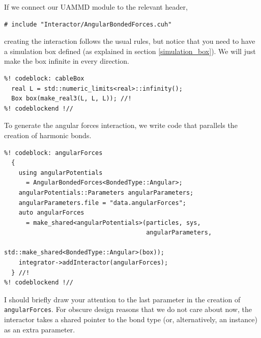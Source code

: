 If we connect our UAMMD module to the relevant header,
\begin{lstlisting}
# include "Interactor/AngularBondedForces.cuh"
\end{lstlisting}
creating the interaction follows the usual rules, but notice that you need to
have a simulation box defined (as explained in section \ref{simulation_box}). We
will just make the box infinite in every direction.
\begin{lstlisting}
%! codeblock: cableBox
  real L = std::numeric_limits<real>::infinity();
  Box box(make_real3(L, L, L)); //!
%! codeblockend !//
\end{lstlisting}
To generate the angular forces interaction, we write code that parallels the
creation of harmonic bonds.
\begin{lstlisting}
%! codeblock: angularForces
  {
    using angularPotentials
      = AngularBondedForces<BondedType::Angular>;
    angularPotentials::Parameters angularParameters;
    angularParameters.file = "data.angularForces";
    auto angularForces
      = make_shared<angularPotentials>(particles, sys,
                                       angularParameters,
                                       std::make_shared<BondedType::Angular>(box));
    integrator->addInteractor(angularForces);
  } //!
%! codeblockend !//
\end{lstlisting}
I should briefly draw your attention to the last parameter in the creation of 
\texttt{angularForces}. For obscure design reasons that we do not care about 
now, the interactor takes a shared pointer to the bond type (or, alternatively, 
an instance) as an extra parameter.

